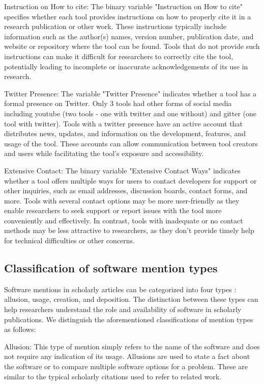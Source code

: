 \documentclass{article}
\begin{document}
Instruction on How to cite: The binary variable "Instruction on How to cite" specifies whether each tool provides instructions on how to properly cite it in a research publication or other work. These instructions typically include information such as the author(s) names, version number, publication date, and website or repository where the tool can be found. Tools that do not provide such instructions can make it difficult for researchers to correctly cite the tool, potentially leading to incomplete or inaccurate acknowledgements of its use in research.

Twitter Presence: The variable "Twitter Presence" indicates whether a tool has a formal presence on Twitter. Only 3 tools had other forms of social media including youtube (two tools - one with twitter and one without) and gitter (one tool with twitter). Tools with a twitter presence have an active account that distributes news, updates, and information on the development, features, and usage of the tool. These accounts can allow communication between tool creators and users while facilitating the tool's exposure and accessibility.

Extensive Contact: The binary variable "Extensive Contact Ways" indicates whether a tool offers multiple ways for users to contact developers for support or other inquiries, such as email addresses, discussion boards, contact forms, and more. Tools with several contact options may be more user-friendly as they enable researchers to seek support or report issues with the tool more conveniently and effectively. In contrast, tools with inadequate or no contact methods may be less attractive to researchers, as they don't provide timely help for technical difficulties or other concerns.


\subsection{Classification of software mention types}


Software mentions in scholarly articles can be categorized into four types \cite{schindler_annotation_2019, schindler_somesci-_2021}: allusion, usage, creation, and deposition. The distinction between these types can help researchers understand the role and availability of software in scholarly publications. We distinguish the aforementioned classifications of mention types as follows:
 
Allusion: This type of mention simply refers to the name of the software and does not require any indication of its usage. Allusions are used to state a fact about the software or to compare multiple software options for a problem. These are similar to the typical scholarly citations used to refer to related work.
 
\end{document}
